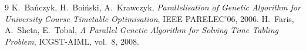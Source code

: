 \documentclass{common/sprawozdanie-agh}
\begin{document}
\begin{thebibliography}{9}
 K.~Bańczyk, H.~Boiński, A.~Krawczyk, \textit{Parallelisation of Genetic Algorithm for University Course Timetable Optimisation}, IEEE PARELEC'06, 2006.
 H.~Faris, A.~Sheta, E.~Tobal, \textit{A Parallel Genetic Algorithm for Solving Time Tabling Problem}, ICGST-AIML, vol.~8, 2008.
\end{thebibliography}
\end{document}
